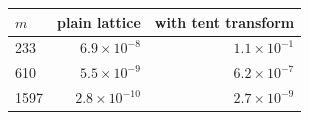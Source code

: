 \begin{tabular}{lrr}
\toprule
$m$ & plain lattice & with tent transform \\
\midrule
233 & $6.9\times10^{-8}$ & $1.1\times10^{-1}$ \\
610 & $5.5\times10^{-9}$ & $6.2\times10^{-7}$ \\
1597 & $2.8\times10^{-10}$ & $2.7\times10^{-9}$ \\
\bottomrule
\end{tabular}
